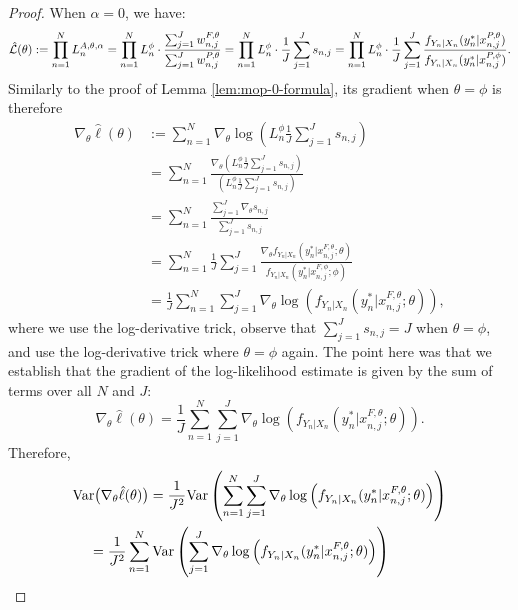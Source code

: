 \begin{proof}
When $\alpha=0$, we have:
\begin{equation}
    \hat{\mathcal{L}}(\theta) := \prod_{n=1}^N L_n^{A, \theta, \alpha} = \prod_{n=1}^N L_n^\phi \cdot \frac{\sum_{j=1}^J w_{n,j}^{F,\theta}}{\sum_{j=1}^J w_{n,j}^{P,\theta}} = \prod_{n=1}^N L_n^\phi \cdot \frac{1}{J}\sum_{j=1}^J s_{n,j} = \prod_{n=1}^N L_n^\phi \cdot \frac{1}{J}\sum_{j=1}^J \frac{f_{Y_n|X_n}(y_n^*|x_{n,j}^{P, \theta})}{f_{Y_n|X_n}(y_n^*|x_{n,j}^{P, \phi})}.
\end{equation}
Similarly to the proof of Lemma \ref{lem:mop-0-formula}, its gradient when $\theta=\phi$ is therefore 
\begin{align}
    \nabla_\theta \hat{\ell}(\theta) &:= \sum_{n=1}^N \nabla_\theta \log\left(L_n^\phi \frac{1}{J} \sum_{j=1}^J s_{n,j}\right) \\
    &= \sum_{n=1}^N \frac{\nabla_\theta \left(L_n^\phi \frac{1}{J} \sum_{j=1}^J s_{n,j}\right)}{\left(L_n^\phi \frac{1}{J} \sum_{j=1}^J s_{n,j}\right)} \\
    &= \sum_{n=1}^N \frac{\sum_{j=1}^J \nabla_\theta s_{n,j}}{\sum_{j=1}^J s_{n,j}} \\
    &= \sum_{n=1}^N \frac{1}{J} \sum_{j=1}^J \frac{\nabla_\theta f_{Y_n|X_{n}}(y_n^*|x_{n,j}^{F, \theta}; \theta)}{f_{Y_n|X_{n}}(y_n^*|x_{n,j}^{F, \phi}; \phi)} \\
    &= \frac{1}{J} \sum_{n=1}^N \sum_{j=1}^J \nabla_\theta \log\left(f_{Y_n|X_{n}}(y_n^*|x_{n,j}^{F, \theta}; \theta)\right),
\end{align}
where we use the log-derivative trick, observe that $\sum_{j=1}^J s_{n,j} = J$ when $\theta=\phi$, and use the log-derivative trick where $\theta=\phi$ again. The point here was that we establish that the gradient of the log-likelihood estimate is given by the sum of terms over all $N$ and $J$:
\begin{equation}
\nabla_\theta \hat{\ell}(\theta) = \frac{1}{J} \sum_{n=1}^N \sum_{j=1}^J \nabla_\theta \log\left(f_{Y_n|X_{n}}(y_n^*|x_{n,j}^{F, \theta}; \theta)\right).
\end{equation}
Therefore,
\begin{align}
    \Var\big(\nabla_\theta \hat\ell(\theta)\big) &= \frac{1}{J^2}\Var\left(\sum_{n=1}^N\sum_{j=1}^{J}\nabla_\theta \log\left(f_{Y_n|X_{n}}(y_n^*|x_{n,j}^{F, \theta}; \theta)\right)\right) \\
    & \hspace{-15mm}= \frac{1}{J^2}\sum_{n=1}^N\Var\left(\sum_{j=1}^{J}\nabla_\theta \log\left(f_{Y_n|X_{n}}(y_n^*|x_{n,j}^{F, \theta}; \theta)\right)\right) \\

\end{align}
\end{proof}
